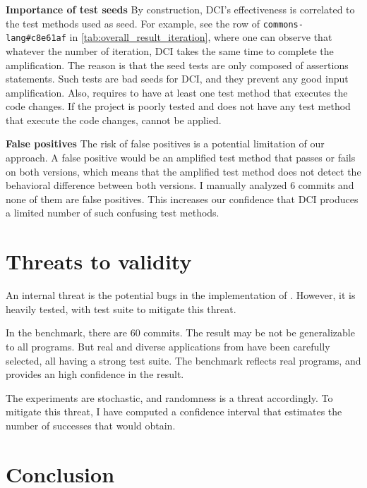 \textbf{Importance of test seeds}
By construction, DCI's effectiveness is correlated to the test methods used as seed.
For example, see the row of \texttt{commons-lang\#c8e61af} in \autoref{tab:overall_result_iteration}, where one can observe that whatever the number of iteration, DCI takes the same time to complete the amplification.
The reason is that the seed tests are only composed of assertions statements.
Such tests are bad seeds for DCI, and they prevent any good input amplification.
Also, \DCI requires to have at least one test method that executes the code changes.
If the project is poorly tested and does not have any test method that execute the code changes, \DCI cannot be applied.

\textbf{False positives}
The risk of false positives is a potential  limitation of our approach.
A false positive would be an amplified test method that passes or fails on both versions, which means that the amplified test method does not detect the behavioral difference between both versions.
I manually analyzed 6 commits and none of them are false positives.
This increases our confidence that DCI produces a limited number of such confusing test methods.

\section{Threats to validity}
\label{sec:dci:threats}

An internal threat is the potential bugs in the implementation of \DCI.
However, it is heavily tested, with \junit test suite to mitigate this threat.

In the benchmark, there are 60 commits. 
The result may be not be generalizable to all programs. 
But real and diverse applications from \gh have been carefully selected, all having a strong test suite. 
The benchmark reflects real programs, and provides an high confidence in the result.

The experiments are stochastic, and randomness is a threat accordingly.
To mitigate this threat, I have computed a confidence interval that estimates the number of successes that \DCI would obtain.

\section{Conclusion}
\label{sec:dci:conclusion}